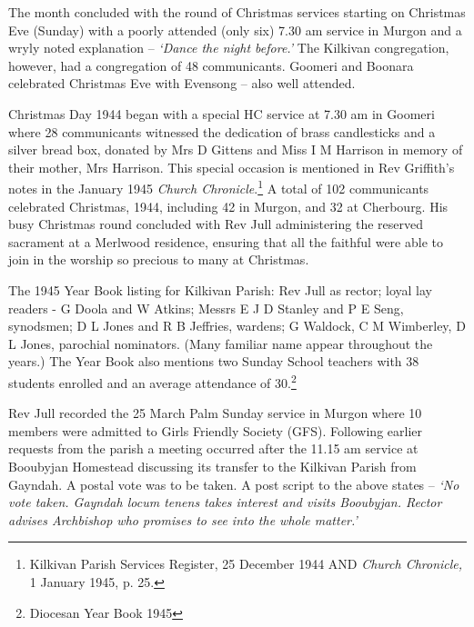 The month concluded with the round of Christmas services starting on Christmas Eve (Sunday) with a poorly attended (only six) 7.30 am service in Murgon and a wryly noted explanation -- \emph{`Dance the night before.'} The Kilkivan congregation, however, had a congregation of 48 communicants. Goomeri and Boonara celebrated Christmas Eve with Evensong -- also well attended.



Christmas Day 1944 began with a special HC service at 7.30 am in Goomeri where 28 communicants witnessed the dedication of brass candlesticks and a silver bread box, donated by Mrs D Gittens and Miss I M Harrison in memory of their mother, Mrs Harrison. This special occasion is mentioned in Rev Griffith's notes in the January 1945 \emph{Church Chronicle}.\footnote{Kilkivan Parish Services Register, 25 December 1944 AND \emph{Church Chronicle,} 1 January 1945, p. 25.} A total of 102 communicants celebrated Christmas, 1944, including 42 in Murgon, and 32 at Cherbourg. His busy Christmas round concluded with Rev Jull administering the reserved sacrament at a Merlwood residence, ensuring that all the faithful were able to join in the worship so precious to many at Christmas.


The 1945 Year Book listing for Kilkivan Parish: Rev Jull as rector; loyal lay readers - G Doola and W Atkins; Messrs E J D Stanley and P E Seng, synodsmen; D L Jones and R B Jeffries, wardens; G Waldock, C M Wimberley, D L Jones, parochial nominators. (Many familiar name appear throughout the years.) The Year Book also mentions two Sunday School teachers with 38 students enrolled and an average attendance of 30.\footnote{Diocesan Year Book 1945}


Rev Jull recorded the 25 March Palm Sunday service in Murgon where 10 members were admitted to Girls Friendly Society (GFS). Following earlier requests from the parish a meeting occurred after the 11.15 am service at Booubyjan Homestead discussing its transfer to the Kilkivan Parish from Gayndah. A postal vote was to be taken. A post script to the above states -- \emph{`No vote taken. Gayndah locum tenens takes interest and visits Booubyjan. Rector advises Archbishop who promises to see into the whole matter.'}



